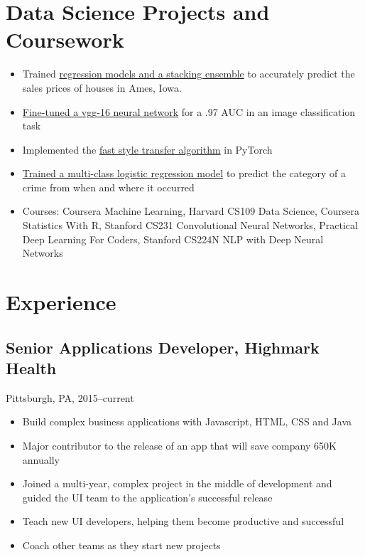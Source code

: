 \documentclass[11pt]{article}
\begin{document}
	\section{Data Science Projects and Coursework}
		\begin{itemize}
			\item Trained \href{https://github.com/ryankresse/ames_housing}{ regression models and a stacking ensemble} to accurately predict the sales prices of houses in Ames, Iowa.
			\item \href{https://github.com/ryankresse/invasive_species}{Fine-tuned a vgg-16 neural network} for a .97 AUC in an image classification task 
			\item Implemented the \href{https://github.com/ryankresse/fast_style_transfer_pytorch}{fast style transfer algorithm} in PyTorch
			\item \href{https://github.com/ryankresse/sf-crime}{Trained a multi-class logistic regression model} to predict the category of a crime from when and where it occurred
			\item Courses: Coursera Machine Learning, Harvard CS109 Data Science, Coursera Statistics With R, Stanford CS231 Convolutional Neural Networks, Practical Deep Learning For Coders, Stanford CS224N NLP with Deep Neural Networks
		\end{itemize}
		
	\section{Experience}
			\subsection{\normalsize{Senior Applications Developer, Highmark Health}}
			{\fontsize{10pt}{\parskip}\selectfont Pittsburgh, PA, 2015--current}
		\begin{itemize}
		\item Build complex business applications with Javascript, HTML, CSS and Java
		\item Major contributor to the release of an app that will save company 650K annually
		\item Joined a multi-year, complex project in the middle of development and guided the UI team to the application's successful release
		\item Teach new UI developers, helping them become productive and successful
		\item Coach other teams as they start new projects
		\end{itemize}
		
\end{document}
